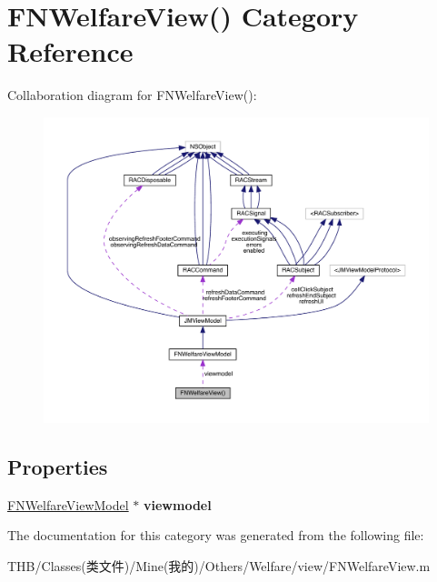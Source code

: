 \hypertarget{category_f_n_welfare_view_07_08}{}\section{F\+N\+Welfare\+View() Category Reference}
\label{category_f_n_welfare_view_07_08}


Collaboration diagram for F\+N\+Welfare\+View()\+:\nopagebreak
\begin{figure}[H]
\begin{center}
\leavevmode
\includegraphics[width=350pt]{category_f_n_welfare_view_07_08__coll__graph}
\end{center}
\end{figure}
\subsection*{Properties}
\begin{DoxyCompactItemize}
\item 
\mbox{\label{category_f_n_welfare_view_07_08_aa55556102798b752615077760dad1b7a}} 
\mbox{\hyperlink{interface_f_n_welfare_view_model}{F\+N\+Welfare\+View\+Model}} $\ast$ {\bfseries viewmodel}
\end{DoxyCompactItemize}


The documentation for this category was generated from the following file\+:\begin{DoxyCompactItemize}
\item 
T\+H\+B/\+Classes(类文件)/\+Mine(我的)/\+Others/\+Welfare/view/F\+N\+Welfare\+View.\+m\end{DoxyCompactItemize}
